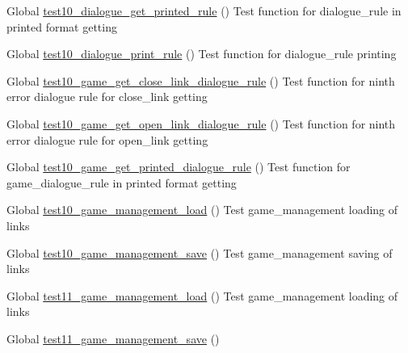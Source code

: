 
\begin{DoxyRefList}
\item[Global \mbox{\hyperlink{dialogue__test_8c_a6c090196a53826f1929f562f03023337}{test10\+\_\+dialogue\+\_\+get\+\_\+printed\+\_\+rule}} ()]\label{test__test000076}%
%
Test function for dialogue\+\_\+rule in printed format getting  
\item[Global \mbox{\hyperlink{dialogue__test_8c_a2d1f7e8aeff323c89817dff813c14a8f}{test10\+\_\+dialogue\+\_\+print\+\_\+rule}} ()]\label{test__test000066}%
%
Test function for dialogue\+\_\+rule printing  
\item[Global \mbox{\hyperlink{game__test_8c_a42954d3c2c2f13b30e8c2f94fba9151d}{test10\+\_\+game\+\_\+get\+\_\+close\+\_\+link\+\_\+dialogue\+\_\+rule}} ()]\label{test__test000386}%
%
Test function for ninth error dialogue rule for close\+\_\+link getting  
\item[Global \mbox{\hyperlink{game__test_8c_a85d82a1ae2bbb1d4953a4b3035d2bc94}{test10\+\_\+game\+\_\+get\+\_\+open\+\_\+link\+\_\+dialogue\+\_\+rule}} ()]\label{test__test000376}%
%
Test function for ninth error dialogue rule for open\+\_\+link getting  
\item[Global \mbox{\hyperlink{game__test_8c_aa83139214f6cfe8f1d0ca58cc3f1fbaf}{test10\+\_\+game\+\_\+get\+\_\+printed\+\_\+dialogue\+\_\+rule}} ()]\label{test__test000320}%
%
Test function for game\+\_\+dialogue\+\_\+rule in printed format getting  
\item[Global \mbox{\hyperlink{game__management__test_8c_a7b600c9be8f74b1d15908546d0faa9e5}{test10\+\_\+game\+\_\+management\+\_\+load}} ()]\label{test__test000118}%
%
Test game\+\_\+management loading of links  
\item[Global \mbox{\hyperlink{game__management__test_8c_a58ce4dc036068afe9838caf13234cdac}{test10\+\_\+game\+\_\+management\+\_\+save}} ()]\label{test__test000132}%
%
Test game\+\_\+management saving of links  
\item[Global \mbox{\hyperlink{game__management__test_8c_a0b33e283ee436a40174b6ddcb30badfb}{test11\+\_\+game\+\_\+management\+\_\+load}} ()]\label{test__test000119}%
%
Test game\+\_\+management loading of links  
\item[Global \mbox{\hyperlink{game__management__test_8c_aa7c8438c2d4dd90287345993805d4c75}{test11\+\_\+game\+\_\+management\+\_\+save}} ()]\label{test__test000133}%

\end{DoxyRefList}
